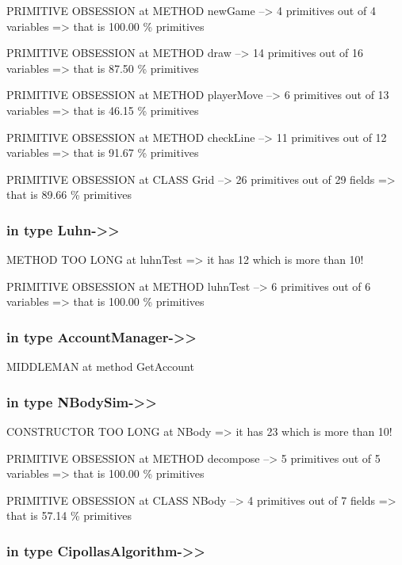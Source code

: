 \documentclass[a4paper]{article}
\begin{document}
\begin{flushleft}
	PRIMITIVE OBSESSION at METHOD newGame --\textgreater{} 4 primitives out
	of 4 variables =\textgreater{} that is 100.00 \% primitives

	PRIMITIVE OBSESSION at METHOD draw --\textgreater{} 14 primitives out of
	16 variables =\textgreater{} that is 87.50 \% primitives

	PRIMITIVE OBSESSION at METHOD playerMove --\textgreater{} 6 primitives
	out of 13 variables =\textgreater{} that is 46.15 \% primitives

	PRIMITIVE OBSESSION at METHOD checkLine --\textgreater{} 11 primitives
	out of 12 variables =\textgreater{} that is 91.67 \% primitives

	PRIMITIVE OBSESSION at CLASS Grid --\textgreater{} 26 primitives out of
	29 fields =\textgreater{} that is 89.66 \% primitives

	\subsubsection{in type Luhn-\textgreater{}\textgreater{}}\label{in-type-luhn-}

	METHOD TOO LONG at luhnTest =\textgreater{} it has 12 which is more than
	10!

	PRIMITIVE OBSESSION at METHOD luhnTest --\textgreater{} 6 primitives out
	of 6 variables =\textgreater{} that is 100.00 \% primitives

	\subsubsection{in type
		AccountManager-\textgreater{}\textgreater{}}\label{in-type-accountmanager-}

	MIDDLEMAN at method GetAccount

	\subsubsection{in type
		NBodySim-\textgreater{}\textgreater{}}\label{in-type-nbodysim-}

	CONSTRUCTOR TOO LONG at NBody =\textgreater{} it has 23 which is more
	than 10!

	PRIMITIVE OBSESSION at METHOD decompose --\textgreater{} 5 primitives
	out of 5 variables =\textgreater{} that is 100.00 \% primitives

	PRIMITIVE OBSESSION at CLASS NBody --\textgreater{} 4 primitives out of
	7 fields =\textgreater{} that is 57.14 \% primitives

	\subsubsection{in type
		CipollasAlgorithm-\textgreater{}\textgreater{}}\label{in-type-cipollasalgorithm-}


\end{flushleft}
\end{document}
